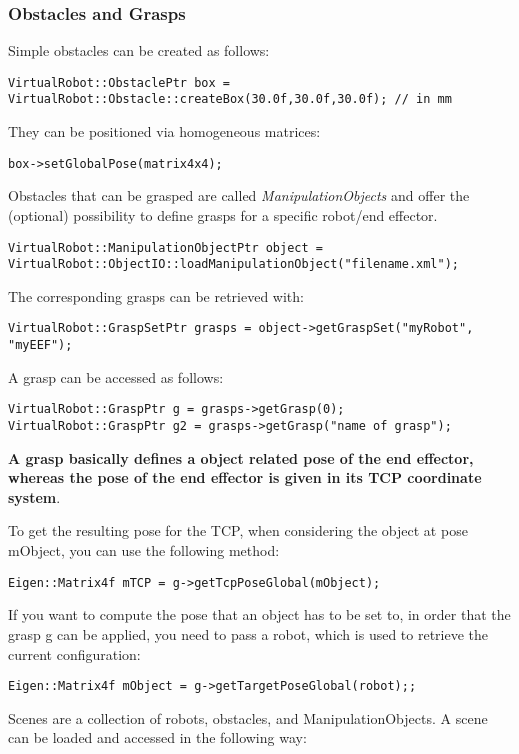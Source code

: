 \subsubsection*{Obstacles and Grasps}
Simple obstacles can be created as follows: 
\begin{lstlisting}
VirtualRobot::ObstaclePtr box = VirtualRobot::Obstacle::createBox(30.0f,30.0f,30.0f); // in mm
\end{lstlisting}
They can be positioned via homogeneous matrices: 
\begin{lstlisting}
box->setGlobalPose(matrix4x4);
\end{lstlisting}
Obstacles that can be grasped are called \textit{ManipulationObjects} and offer the (optional) possibility to define grasps for a specific robot/end effector. 
\begin{lstlisting}
VirtualRobot::ManipulationObjectPtr object = VirtualRobot::ObjectIO::loadManipulationObject("filename.xml");
\end{lstlisting}
The corresponding grasps can be retrieved with: 
\begin{lstlisting}
VirtualRobot::GraspSetPtr grasps = object->getGraspSet("myRobot", "myEEF");
\end{lstlisting}
A grasp can be accessed as follows: 
\begin{lstlisting}
VirtualRobot::GraspPtr g = grasps->getGrasp(0);
VirtualRobot::GraspPtr g2 = grasps->getGrasp("name of grasp");
\end{lstlisting}
\textbf{A grasp basically defines a object related pose of the end effector, whereas the pose of the end effector is given in its TCP coordinate system}.\par To get the resulting pose for the TCP, when considering the object at pose mObject, you can use the following method: 
\begin{lstlisting}
Eigen::Matrix4f mTCP = g->getTcpPoseGlobal(mObject);
\end{lstlisting}
If you want to compute the pose that an object has to be set to, in order that the grasp g can be applied, you need to pass a robot, which is used to retrieve the current configuration: 
\begin{lstlisting}
Eigen::Matrix4f mObject = g->getTargetPoseGlobal(robot);;
\end{lstlisting}
Scenes are a collection of robots, obstacles, and ManipulationObjects. A scene can be loaded and accessed in the following way: 
